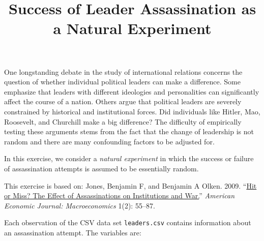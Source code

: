 \documentclass[]{article}
\title{Success of Leader Assassination as a Natural Experiment}
\author{}
\date{}
\begin{document}
\maketitle


One longstanding debate in the study of international relations concerns
the question of whether individual political leaders can make a
difference. Some emphasize that leaders with different ideologies and
personalities can significantly affect the course of a nation. Others
argue that political leaders are severely constrained by historical and
institutional forces. Did individuals like Hitler, Mao, Roosevelt, and
Churchill make a big difference? The difficulty of empirically testing
these arguments stems from the fact that the change of leadership is not
random and there are many confounding factors to be adjusted for.

In this exercise, we consider a \emph{natural experiment} in which the
success or failure of assassination attempts is assumed to be
essentially random.

This exercise is based on: Jones, Benjamin F, and Benjamin A Olken.
2009. ``\href{http://dx.doi.org/10.1257/mac.1.2.55}{Hit or Miss? The
Effect of Assassinations on Institutions and War.}'' \emph{American
Economic Journal: Macroeconomics} 1(2): 55--87.

Each observation of the CSV data set \texttt{leaders.csv} contains
information about an assassination attempt. The variables are:
\end{document}
